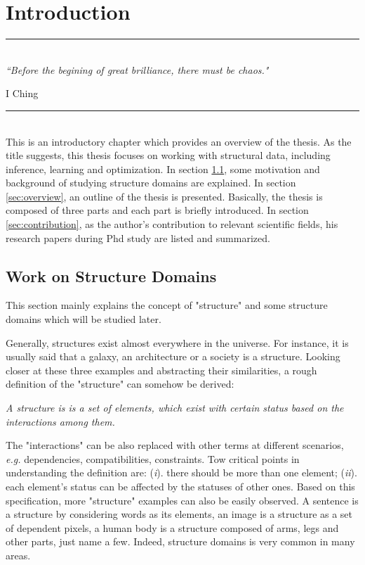 
\chapter{Introduction} %
\label{Chapter1} %

\rule{\textwidth}{0.4pt} \\[0.5cm]
\textit{``Before the begining of great brilliance, there must be chaos."}

\begin{flushright}
I Ching
\end{flushright}
\rule{\textwidth}{0.4pt} 
\\
This is an introductory chapter which provides an overview of the thesis. As the title suggests, this thesis focuses on working with structural data, including 
inference, learning and optimization. In section \ref{sec:motivation}, some motivation and background of studying structure domains are explained. In section \ref{sec:overview}, 
an outline of the thesis is presented. Basically, the thesis is composed of three parts and each part is briefly introduced. In section \ref{sec:contribution}, as the author's 
contribution to relevant scientific fields, his research papers during Phd study are listed and summarized.       


\section{Work on Structure Domains}
\label{sec:motivation}
This section mainly explains the concept of "structure" and some structure domains which will be studied later.                  

Generally, structures exist almost everywhere in the universe. For instance, it is usually said that a galaxy, an architecture or a society is a structure.          
Looking closer at these three examples and abstracting their similarities, a rough definition of the "structure" can somehow be derived:     

\textit{A structure is is a set of elements, which exist with certain status based on the interactions among them. }  

The "interactions" can be also replaced with other terms at different scenarios, \emph{e.g.} dependencies, compatibilities, constraints. 
Tow critical points in understanding the definition are: (\emph{i}). there should be more than one element; (\emph{ii}). each element's status can be affected by the statuses of other ones.  
Based on this specification, 
more "structure" 
examples can also be easily observed. A sentence is a structure by considering words as its elements, an image is a structure as a set of dependent pixels, a human body is a structure composed of 
arms, legs and other parts, just name a few. Indeed, structure domains is very common in many areas.  



